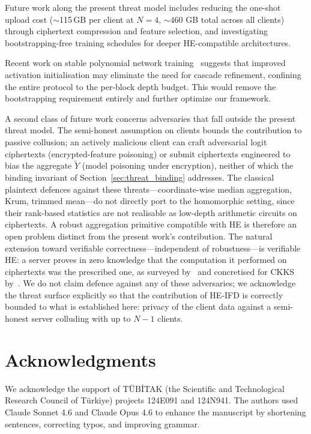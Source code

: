 Future work along the present threat model includes reducing the one-shot upload cost (${\sim}$115\,GB per client at $N{=}4$, $\sim 460$ GB total across all clients) through ciphertext compression and feature selection, and investigating bootstrapping-free training schedules for deeper HE-compatible architectures.

\label{sec:conclusion_extensions}
Recent work on stable polynomial network training~\cite{agamennone2025polynomial, alhossain2025training} suggests that improved activation initialisation may eliminate the need for cascade refinement, confining the entire protocol to the per-block depth budget. This would remove the bootstrapping requirement entirely and further optimize our framework.

A second class of future work concerns adversaries that fall outside the present threat model. The semi-honest assumption on clients bounds the contribution to passive collusion; an actively malicious client can craft adversarial logit ciphertexts (encrypted-feature poisoning) or submit ciphertexts engineered to bias the aggregate $\widetilde{Y}$ (model poisoning under encryption), neither of which the binding invariant of Section~\ref{sec:threat_binding} addresses. The classical plaintext defences against these threats---coordinate-wise median aggregation, Krum, trimmed mean---do not directly port to the homomorphic setting, since their rank-based statistics are not realisable as low-depth arithmetic circuits on ciphertexts. A robust aggregation primitive compatible with HE is therefore an open problem distinct from the present work's contribution. The natural extension toward verifiable correctness---independent of robustness---is verifiable HE: a server proves in zero knowledge that the computation it performed on ciphertexts was the prescribed one, as surveyed by~\cite{viand2023verifiable} and concretised for CKKS by~\cite{atapoor2024vfhe}. We do not claim defence against any of these adversaries; we acknowledge the threat surface explicitly so that the contribution of HE-IFD is correctly bounded to what is established here: privacy of the client data against a semi-honest server colluding with up to $N{-}1$ clients. %

\section*{Acknowledgments}
We acknowledge the support of TÜBİTAK (the Scientific and Technological Research Council of Türkiye) projects 124E091 and 124N941. The authors used Claude Sonnet 4.6 and Claude Opus 4.6 to enhance the manuscript by shortening sentences, correcting typos, and improving grammar.